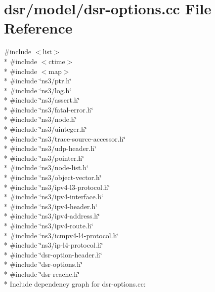 \hypertarget{dsr-options_8cc}{}\section{dsr/model/dsr-\/options.cc File Reference}
\label{dsr-options_8cc}
{\ttfamily \#include $<$list$>$}\\*
{\ttfamily \#include $<$ctime$>$}\\*
{\ttfamily \#include $<$map$>$}\\*
{\ttfamily \#include \char`\"{}ns3/ptr.\+h\char`\"{}}\\*
{\ttfamily \#include \char`\"{}ns3/log.\+h\char`\"{}}\\*
{\ttfamily \#include \char`\"{}ns3/assert.\+h\char`\"{}}\\*
{\ttfamily \#include \char`\"{}ns3/fatal-\/error.\+h\char`\"{}}\\*
{\ttfamily \#include \char`\"{}ns3/node.\+h\char`\"{}}\\*
{\ttfamily \#include \char`\"{}ns3/uinteger.\+h\char`\"{}}\\*
{\ttfamily \#include \char`\"{}ns3/trace-\/source-\/accessor.\+h\char`\"{}}\\*
{\ttfamily \#include \char`\"{}ns3/udp-\/header.\+h\char`\"{}}\\*
{\ttfamily \#include \char`\"{}ns3/pointer.\+h\char`\"{}}\\*
{\ttfamily \#include \char`\"{}ns3/node-\/list.\+h\char`\"{}}\\*
{\ttfamily \#include \char`\"{}ns3/object-\/vector.\+h\char`\"{}}\\*
{\ttfamily \#include \char`\"{}ns3/ipv4-\/l3-\/protocol.\+h\char`\"{}}\\*
{\ttfamily \#include \char`\"{}ns3/ipv4-\/interface.\+h\char`\"{}}\\*
{\ttfamily \#include \char`\"{}ns3/ipv4-\/header.\+h\char`\"{}}\\*
{\ttfamily \#include \char`\"{}ns3/ipv4-\/address.\+h\char`\"{}}\\*
{\ttfamily \#include \char`\"{}ns3/ipv4-\/route.\+h\char`\"{}}\\*
{\ttfamily \#include \char`\"{}ns3/icmpv4-\/l4-\/protocol.\+h\char`\"{}}\\*
{\ttfamily \#include \char`\"{}ns3/ip-\/l4-\/protocol.\+h\char`\"{}}\\*
{\ttfamily \#include \char`\"{}dsr-\/option-\/header.\+h\char`\"{}}\\*
{\ttfamily \#include \char`\"{}dsr-\/options.\+h\char`\"{}}\\*
{\ttfamily \#include \char`\"{}dsr-\/rcache.\+h\char`\"{}}\\*
Include dependency graph for dsr-\/options.cc\+:
